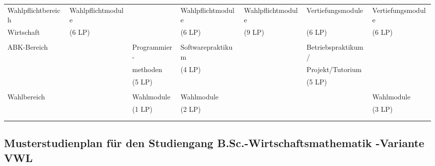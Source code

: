 \begin{center}
\begin{tabular}{||l||l|l|l|l|l|l||}
\hhline{|:=::=|=|=|=|=|=:|} Wahlpflichtbereich&Wahlpflichtmodule&&Wahlpflichtmodule &Wahlpflichtmodule&Vertiefungsmodule&Vertiefungsmodule \\
\hhline{||~||~|~|~|~|~|~||} Wirtschaft&(6 LP)&&(6 LP)&(9 LP)&(6 LP)&(6 LP)\\
\hhline{||~||~|~|~|~|~|~||} &&&&&&\\
\hhline{|:=::======:|} ABK-Bereich&&Programmier-&Softwarepraktikum&&Betriebspraktikum/& \\
\hhline{||~||~|~|~|~|~|~||} &&methoden&(4 LP)&&Projekt/Tutorium&\\
\hhline{||~||~|~|~|~|~|~||} &&(5 LP)&&&(5 LP)&\\
\hhline{||~||~|~|~|~|~|~||} &&&&&&\\
\hhline{|:=::======:|} Wahlbereich&&Wahlmodule&Wahlmodule&&&Wahlmodule\\
\hhline{||~||~|~|~|~|~|~||} &&(1 LP)&(2 LP)&&&(3 LP)\\
\hhline{||~||~|~|~|~|~|~||} &&&&&&\\
\hhline{|b:=:b:======:b|}
\end{tabular}
\end{center}

\subsection{Musterstudienplan für den Studiengang B.Sc.-Wirtschaftsmathematik -Variante VWL}

